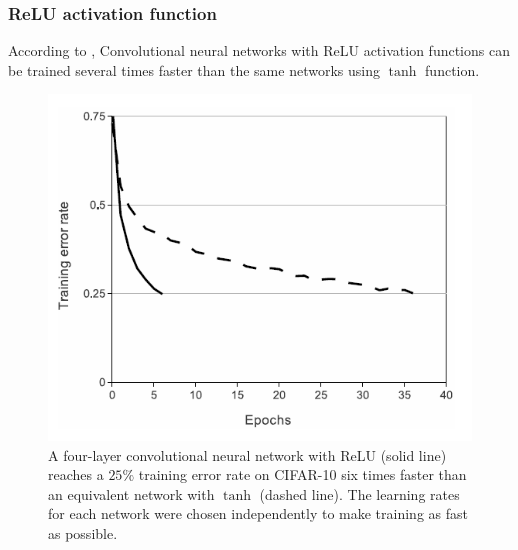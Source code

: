 \begin{frame}
	\frametitle{ReLU activation function}

	According to \cite{krizhevsky2012imagenet}, Convolutional neural networks with ReLU activation functions can be trained several times faster than the same networks using $\tanh$ function.

	\medskip

	\begin{center}
		\begin{figure}
		\includegraphics[scale=0.75]{figs/Alexnet_reluVsTanh}
		\caption{A four-layer convolutional neural network with ReLU (solid line) reaches a $25\%$ training error rate on CIFAR-10 six times faster than an equivalent network with $\tanh$ (dashed line). The learning rates for each network were chosen independently to make training as fast as possible.}
		\end{figure}

	\end{center}

\end{frame}


